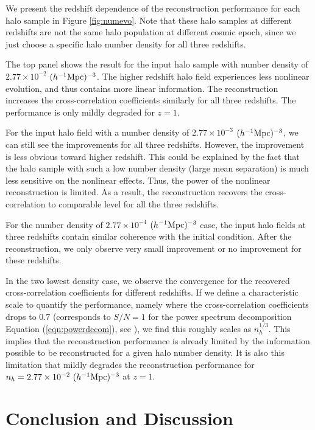\documentclass[iop]{emulateapj}
\newcommand{\mpch}{h^{-1} {\rm Mpc}}
\begin{document}
{We present the redshift dependence of the reconstruction performance for each halo sample in Figure \ref{fig:numevo}.
Note that these halo samples at different redshifts are not the same halo population at different cosmic epoch, since we just choose a specific halo number density for all three redshifts.

The top panel shows the result for the input halo sample with number density of $2.77\times 10^{-2}$ $(\mpch)^{-3}$. 
The higher redshift halo field experiences less nonlinear evolution, and thus contains more linear information.
The reconstruction increases the cross-correlation coefficients similarly for all three redshifts.
The performance is only mildly degraded for $z=1$.

For the input halo field with a number density of $2.77\times 10^{-3}$ $(\mpch)^{-3}$, we can still see the improvements for all three redshifts.
However, the improvement is less obvious toward higher redshift.
This could be explained by the fact that the halo sample with such a low number density (large mean separation) is much less sensitive on the nonlinear effects.
Thus, the power of the nonlinear reconstruction is limited.
As a result, the reconstruction recovers the cross-correlation to comparable level for all the three redshifts.

For the number density of $2.77\times 10^{-4}$ $(\mpch)^{-3}$ case, the input halo fields at three redshifts contain similar coherence with the initial condition.
After the reconstruction, we only observe very small improvement or no improvement for these redshifts.

In the two lowest density case, we observe the convergence for the recovered cross-correlation coefficients for different redshifts.
If we define a characteristic scale to quantify the performance, namely where the cross-correlation coefficients drops to 0.7 (corresponds to $S/N=1$ for the power spectrum decomposition Equation (\ref{eqn:powerdecom}), see \cite{zhuhm16a}),   
we find this roughly scales as $n_h^{1/3}$.
This implies that the reconstruction performance is already limited by the information possible to be reconstructed for a given halo number density.
It is also this limitation that mildly degrades the reconstruction performance for $n_h=2.77\times 10^{-2}\ (\mpch)^{-3}$ at $z=1$.



\section{Conclusion and Discussion}
\label{sec:conclusion}

}
\end{document}
